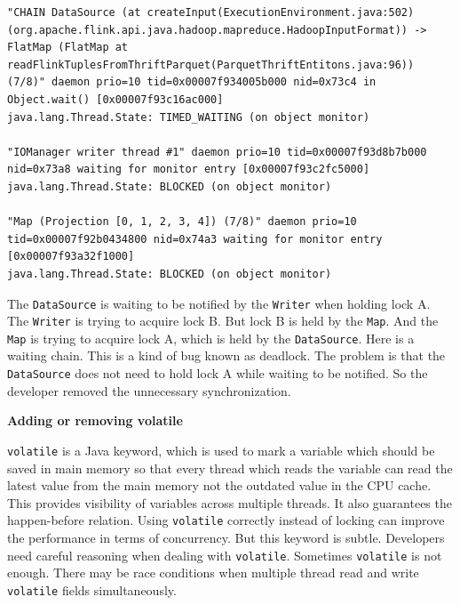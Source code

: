 \begin{lstlisting}
"CHAIN DataSource (at createInput(ExecutionEnvironment.java:502) (org.apache.flink.api.java.hadoop.mapreduce.HadoopInputFormat)) -> FlatMap (FlatMap at readFlinkTuplesFromThriftParquet(ParquetThriftEntitons.java:96)) (7/8)" daemon prio=10 tid=0x00007f934005b000 nid=0x73c4 in Object.wait() [0x00007f93c16ac000]
java.lang.Thread.State: TIMED_WAITING (on object monitor)

"IOManager writer thread #1" daemon prio=10 tid=0x00007f93d8b7b000 nid=0x73a8 waiting for monitor entry [0x00007f93c2fc5000]
java.lang.Thread.State: BLOCKED (on object monitor)

"Map (Projection [0, 1, 2, 3, 4]) (7/8)" daemon prio=10 tid=0x00007f92b0434800 nid=0x74a3 waiting for monitor entry [0x00007f93a32f1000]
java.lang.Thread.State: BLOCKED (on object monitor)
\end{lstlisting}

The \texttt{DataSource} is waiting to be notified by the \texttt{Writer} when holding lock A. The \texttt{Writer} is trying to acquire lock B. But lock B is held by the \texttt{Map}. And the \texttt{Map} is trying to acquire lock A, which is held by the \texttt{DataSource}. Here is a waiting chain. This is a kind of bug known as deadlock. The problem is that the \texttt{DataSource} does not need to hold lock A while waiting to be notified. So the developer removed the unnecessary synchronization.

\textbf{Adding or removing volatile}

\texttt{volatile} is a Java keyword, which is used to mark a variable which should be saved in main memory so that every thread which reads the variable can read the latest value from the main memory not the outdated value in the CPU cache. This provides visibility of variables across multiple threads. It also guarantees the happen-before relation. Using \texttt{volatile} correctly instead of locking can improve the performance in terms of concurrency. But this keyword is subtle. Developers need careful reasoning when dealing with \texttt{volatile}. Sometimes \texttt{volatile} is not enough. There may be race conditions when multiple thread read and write \texttt{volatile} fields simultaneously.

